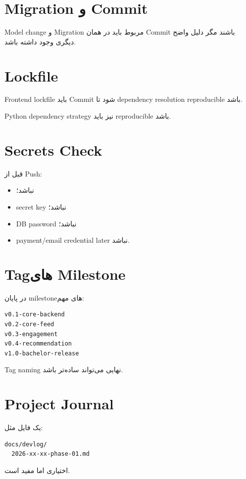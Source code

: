 \section{Migration و Commit}

Model change و Migration مربوط باید در همان Commit باشند مگر دلیل واضح دیگری وجود داشته باشد.

\section{Lockfile}

Frontend lockfile باید Commit شود تا dependency resolution reproducible باشد.

Python dependency strategy نیز باید reproducible باشد.

\section{Secrets Check}

قبل از Push:
\begin{itemize}
  \item {} نباشد؛
  \item secret key نباشد؛
  \item DB password نباشد؛
  \item payment/email credential later نباشد.
\end{itemize}

\section{Tagهای Milestone}

در پایان milestoneهای مهم:
\begin{latin}
\begin{lstlisting}
v0.1-core-backend
v0.2-core-feed
v0.3-engagement
v0.4-recommendation
v1.0-bachelor-release
\end{lstlisting}
\end{latin}

Tag naming نهایی می‌تواند ساده‌تر باشد.

\section{Project Journal}

یک فایل مثل:
\begin{latin}
\begin{lstlisting}
docs/devlog/
  2026-xx-xx-phase-01.md
\end{lstlisting}
\end{latin}
اختیاری اما مفید است.

